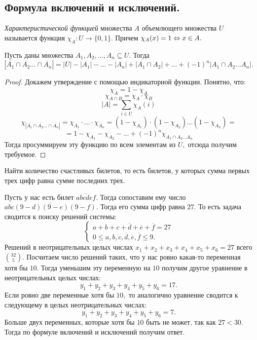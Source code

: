 \subsection{Формула включений и исключений.}

\begin{definition}
    \textit{Характеристической функцией} множества $A$ объемлющего множества $U$ называется функция $\chi_{A}: U \rightarrow \{0, 1\}.$ Причем $\chi_{A}(x) = 1 \Leftrightarrow x \in A.$
\end{definition}

\begin{theorem}
    Пусть даны множества $A_1, A_2, \ldots, A_n \subseteq U.$
    Тогда $$|\overline{A_1} \cap \overline{A_2} \ldots \cap \overline{A_n}| =  |U| - |A_1|- \ldots - |A_n| + |A_1 \cap A_2| + \ldots + (-1)^n |A_1 \cap A_2 \ldots A_n|.$$
\end{theorem}

\begin{proof}
Докажем утверждение с помощью индикаторной функции. Понятно, что:
$$\chi_{\overline{A}} = 1 - \chi_A$$
$$\chi_{A\cap B} = \chi_A \cdot \chi_B$$
$$|A| = \sum_{i \in U} \chi_A(i)$$
$$\chi_{|\overline{A_1} \cap \overline{A_2} \ldots \cap \overline{A_n}|} = \chi_{\overline{A_1}} \cdot \ldots  \cdot \chi_{\overline{A_n}} = (1 - \chi_{A_1}) \cdot (1 - \chi_{A_2}) \ldots (1 - \chi_{A_n}) = $$
$$= 1 - \chi_{A_1} - \chi_{A_2} - \ldots + (-1)^n \chi_{A_1 \cap A_2 \ldots A_{n}}$$
Тогда просуммируем эту функцию по всем элементам из $U,$ отсюда получим требуемое.
\end{proof}

\begin{example}
    Найти количество счастливых билетов, то есть билетов, у которых сумма первых трех цифр равна сумме последних трех.
\end{example}

\begin{solution}
    Пусть у нас есть билет $\overline{abcdef}.$ Тогда сопоставим ему число $\overline{abc(9-d)(9-e)(9-f)}.$ Тогда его сумма цифр равна $27.$ То есть задача сводится к поиску решений системы:
    $$\left\{\begin{array}{l}
    a + b + c + \overline{d} + \overline{e} + \overline{f} = 27\\
    0\leq a, b, c, \overline{d}, \overline{e}, \overline{f} \leq 9.
    \end{array}\right.$$
    Решений в неотрицательных целых числах $x_1 + x_2 + x_3 + x_4 + x_5 + x_6 = 27$ всего $\binom{32}{5}.$ Посчитаем число решений таких, что у нас ровно какая-то переменная хотя бы $10.$ Тогда уменьшим эту переменную на $10$ получим другое уравнение в неотрицательных целых числах:
    $$y_1 + y_2 + y_3 + y_4 + y_5 + y_6 = 17.$$ Если ровно две переменные хотя бы $10,$ то аналогично уравнение сводится к следующему в целых неотрицательных числах:
    $$y_1 + y_2 + y_3 + y_4 + y_5 + y_6 = 7.$$
    Больше двух переменных, которые хотя бы $10$ быть не может, так как $27 < 30.$ Тогда по формуле включений и исключений получим ответ.
\end{solution}

